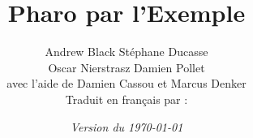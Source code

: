 \documentclass[a4paper,10pt,twoside]{book}
\begin{document}
\frontmatter
\setcounter{page}{1}
\pagestyle{headings}
\author{
	Andrew Black\quad
	St\'ephane Ducasse\\[1ex]
	Oscar Nierstrasz\quad
	Damien Pollet
	\\[4ex]
	avec l'aide de Damien Cassou et Marcus Denker
	\\[4ex]
Traduit en fran\c{c}ais par :\\[2ex]
	}
\title{\Huge\bf Pharo par l'Exemple}
\numdate
{}
\date{\emph{Version du \today}}
\maketitle
~ %
\vfill
\end{document}

